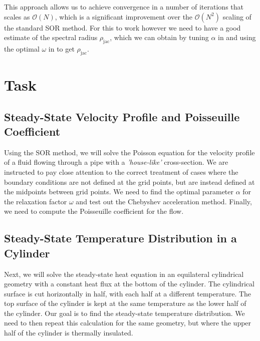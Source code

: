 \documentclass[10pt, titlepage, a4paper]{article}
\begin{document}
This approach allows us to achieve convergence in a number of iterations that scales as $\mathcal{O}(N)$, which is a significant improvement 
over the $\mathcal{O}(N^2)$ scaling of the standard SOR method. For this to work however we need to have a good estimate of the spectral radius $\rho_\text{jac}$, which we 
can obtain by tuning $\alpha$ in  and using the optimal $\omega$ in  to get $\rho_\text{jac}$.

\section{Task}
\subsection{Steady-State Velocity Profile and Poisseuille Coefficient}
Using the SOR method, we will solve the Poisson equation for the velocity profile of a fluid flowing through a pipe with a \textit{'house-like'} cross-section. We are instructed to 
pay close attention to the correct treatment of cases where the boundary conditions are not defined at the grid points, but are instead defined at the midpoints between grid points. 
We need to find the optimal parameter $\alpha$ for the relaxation factor $\omega$ and test out the Chebyshev acceleration method. Finally, we need to 
compute the Poisseuille coefficient for the flow.

\begin{figure}[H]
    \centering
\end{figure}

\subsection{Steady-State Temperature Distribution in a Cylinder}
Next, we will solve the steady-state heat equation in an equilateral cylindrical geometry with a constant heat flux at the bottom of the cylinder. The cylindrical surface is 
cut horizontally in half, with each half at a different temperature. The top surface of the cylinder is kept at the same temperature as the lower half of the cylinder. 
Our goal is to find the steady-state temperature distribution. We need to then repeat this calculation for the same geometry, but where the upper half of the cylinder is thermally insulated.
\end{document}
